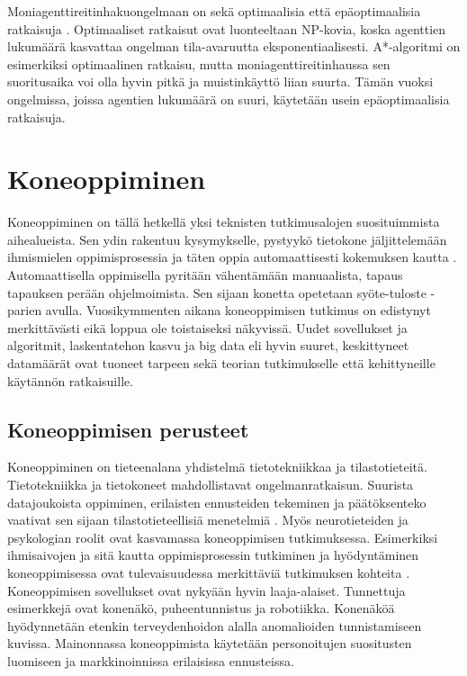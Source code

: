 \documentclass[utf8]{gradu3}
\begin{document}
Moniagenttireitinhakuongelmaan on sekä optimaalisia että epäoptimaalisia ratkaisuja \parencite{sharon2015conflict}. Optimaaliset ratkaisut ovat luonteeltaan NP-kovia, koska agenttien lukumäärä kasvattaa ongelman tila-avaruutta eksponentiaalisesti. A*-algoritmi on esimerkiksi optimaalinen ratkaisu, mutta moniagenttireitinhaussa sen suoritusaika voi olla hyvin pitkä ja muistinkäyttö liian suurta. Tämän vuoksi ongelmissa, joissa agentien lukumäärä on suuri, käytetään usein epäoptimaalisia ratkaisuja.

\chapter{Koneoppiminen}
\label{koneoppiminen}

Koneoppiminen on tällä hetkellä yksi teknisten tutkimusalojen suosituimmista aihealueista. Sen ydin rakentuu kysymykselle, pystyykö tietokone jäljittelemään ihmismielen oppimisprosessia ja täten oppia automaattisesti kokemuksen kautta \parencite{das2017survey,jordan2015machine}. Automaattisella oppimisella pyritään vähentämään manuaalista, tapaus tapauksen perään ohjelmoimista. Sen sijaan konetta opetetaan syöte-tuloste -parien avulla. Vuosikymmenten aikana koneoppimisen tutkimus on edistynyt merkittävästi eikä loppua ole toistaiseksi näkyvissä. Uudet sovellukset ja algoritmit, laskentatehon kasvu ja big data eli hyvin suuret, keskittyneet datamäärät ovat tuoneet tarpeen sekä teorian tutkimukselle että kehittyneille käytännön ratkaisuille.

\section{Koneoppimisen perusteet}

Koneoppiminen on tieteenalana yhdistelmä tietotekniikkaa ja tilastotieteitä. Tietotekniikka ja tietokoneet mahdollistavat ongelmanratkaisun. Suurista datajoukoista oppiminen, erilaisten ennusteiden tekeminen ja päätöksenteko vaativat sen sijaan tilastotieteellisiä menetelmiä \parencite{das2017survey,jordan2015machine}. Myös neurotieteiden ja psykologian roolit ovat kasvamassa koneoppimisen tutkimuksessa. Esimerkiksi ihmisaivojen ja sitä kautta oppimisprosessin tutkiminen ja hyödyntäminen koneoppimisessa ovat tulevaisuudessa merkittäviä tutkimuksen kohteita \parencite{das2017survey}. Koneoppimisen sovellukset ovat nykyään hyvin laaja-alaiset. Tunnettuja esimerkkejä ovat konenäkö, puheentunnistus ja robotiikka. Konenäköä hyödynnetään etenkin terveydenhoidon alalla anomalioiden tunnistamiseen kuvissa. Mainonnassa koneoppimista käytetään personoitujen suositusten luomiseen ja markkinoinnissa erilaisissa ennusteissa.
\end{document}
